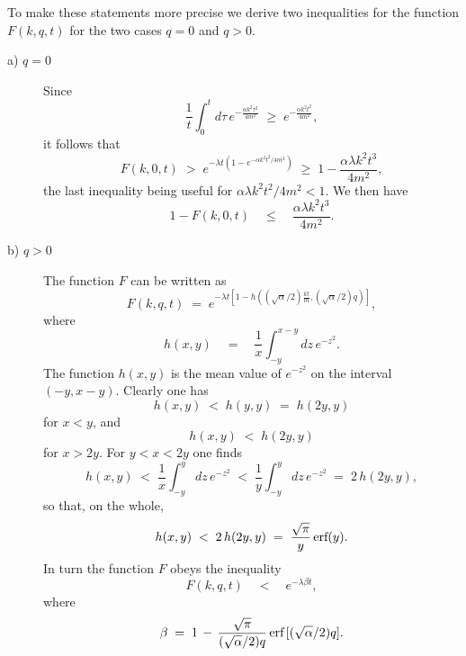 \documentclass[12pt]{article}
\begin{document}
To make these statements more precise we derive two inequalities
for the function $F(k,q,t)$ for the two cases $q=0$ and $q>0$.
\begin{description}
\item[a) $q=0$] Since
\begin{equation}
\frac{1}{t}\int_{0}^{t} d\tau\, e^{\displaystyle - \frac{\alpha
k^{2}\tau^{2}}{4m^{2}}} \; \geq \; e^{\displaystyle - \frac{\alpha
k^{2}t^{2}}{4m^{2}}},
\end{equation}
it follows that
\begin{equation} \label{hdgxTJ}
F(k,0,t) \; > \; e^{\displaystyle -\lambda t \left( 1 -
e^{\displaystyle - \alpha k^{2} t^{2}/4m^{2}} \right)} \; \geq \;
1 - \frac{\alpha\lambda k^{2} t^{3}}{4m^{2}},
\end{equation}
the last inequality being useful for $\alpha\lambda k^{2}
t^{2}/4m^{2} < 1$. We then have
\begin{equation} \label{lkjh}
1 - F(k,0,t) \quad \leq \quad \frac{\alpha\lambda k^{2}
t^{3}}{4m^{2}}.
\end{equation}
\item[b) $q>0$] The function $F$ can be written as
\begin{equation}
F(k,q,t) \; = \; e^{\displaystyle -\lambda t \left[ 1 - h\left(
(\sqrt{\alpha}/2)\frac{kt}{m}, (\sqrt{\alpha}/2)q\right) \right]},
\end{equation}
where
\begin{equation}
h(x,y) \quad = \quad \frac{1}{x}\int_{-y}^{x-y}dz\,
e^{\displaystyle - z^{2}}.
\end{equation}
The function $h(x,y)$ is the mean value of $e^{-z^{2}}$ on the
interval $(-y, x-y)$. Clearly one has
\begin{equation}
h(x,y) \; < \; h(y,y) \; = \; h(2y,y)
\end{equation}
for $x < y$, and
\begin{equation}
h(x,y) \; < \; h(2y,y)
\end{equation}
for $x > 2y$. For $y < x < 2y$ one finds
\begin{equation}
h(x,y) \; < \; \frac{1}{x}\int_{-y}^{y}dz\, e^{\displaystyle -
z^{2}} \; < \; \frac{1}{y}\int_{-y}^{y}dz\, e^{\displaystyle -
z^{2}} \; = \; 2\,h(2y,y),
\end{equation}
so that, on the whole,
\begin{equation}
h(x,y) \; < \; 2\, h(2y,y) \; = \; \frac{\sqrt{\pi}}{y}\,
\makebox{erf} (y).
\end{equation}
In turn the function $F$ obeys the inequality
\begin{equation} \label{ldem}
F(k,q,t) \quad < \quad e^{\displaystyle -\lambda\beta t},
\end{equation}
where
\begin{equation} \label{gupnld}
\beta \; =\; 1 \, - \, \frac{\sqrt{\pi}}{(\sqrt{\alpha}/2)q}\,
\makebox{erf}\,[(\sqrt{\alpha}/2)q].
\end{equation}
\end{description}
\end{document}
